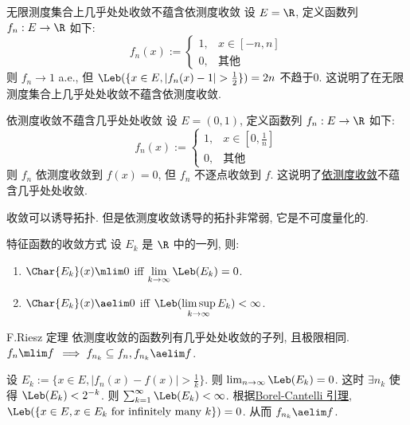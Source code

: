 \begin{cxmp}
    {无限测度集合上几乎处处收敛不蕴含依测度收敛}
    设 $E=\R$, 定义函数列 \(f_n:E\to\R\) 如下:
    \[f_n(x):=\begin{cases}
        1, & x\in[-n,n]\\
        0, & \text{其他}
    \end{cases}\]
    则 \(f_n\to 1\) a.e., 但 \(\Leb(\{x\in E, |f_n(x)-1|>\frac{1}{2}\})=2n\) 不趋于0. 这说明了在无限测度集合上几乎处处收敛不蕴含依测度收敛.
\end{cxmp}
\begin{cxmp}
    {依测度收敛不蕴含几乎处处收敛}
    设 $E=(0,1)$, 定义函数列 \(f_n:E\to\R\) 如下:
    \[f_n(x):=\begin{cases}
        1, & x\in[0,\frac{1}{n}]\\
        0, & \text{其他}
    \end{cases}\]
    则 \(f_n\) 依测度收敛到 \(f(x)=0\), 但 \(f_n\) 不逐点收敛到 \(f\). 这说明了\hyperref[dfn:convergence-in-measure]{依测度收敛}不蕴含几乎处处收敛.
\end{cxmp}
\begin{rmk}
    [Dedicatia]
    收敛可以诱导拓扑. 但是依测度收敛诱导的拓扑非常弱, 它是不可度量化的. 
\end{rmk}
\begin{ins}
    {特征函数的收敛方式}
    设 \(E_k\) 是 \(\R\) 中的一列\MeasurableSet{}, 则:
    \begin{enumerate}
        \item \(\Char{E_k}(x)\mlim 0\) iff \(\displaystyle\lim_{k\to\infty}\Leb(E_k)= 0\).
        \item \(\Char{E_k}(x)\aelim 0\) iff \(\displaystyle\Leb(\limsup_{k\to\infty} E_k)<\infty\).
    \end{enumerate}
\end{ins}
\begin{thm}
    [riesz]
    {F.Riesz 定理}
    依测度收敛的函数列有几乎处处收敛的子列, 且极限相同.\\
    $f_n\mlim f$ \(\implies f_{n_k}\subseteq f_n, f_{n_k}\aelim f\).
\end{thm}
\begin{prf}
    设 \(E_k:=\{x\in E, |f_n(x)-f(x)|>\frac{1}{k}\}\). 则 \(\lim_{n\to\infty} \Leb(E_k)=0\). 这时 \(\exists n_k\) 使得 \(\Leb(E_k)<2^{-k}\). 则 \(\sum_{k=1}^\infty \Leb(E_k)<\infty\). 
    根据\hyperref[thm:borel-cantelli]{Borel-Cantelli 引理}, \(\Leb(\{x\in E, x\in E_k \text{ for infinitely many } k\})=0\). 从而 \(f_{n_k}\aelim f\).
\end{prf}

